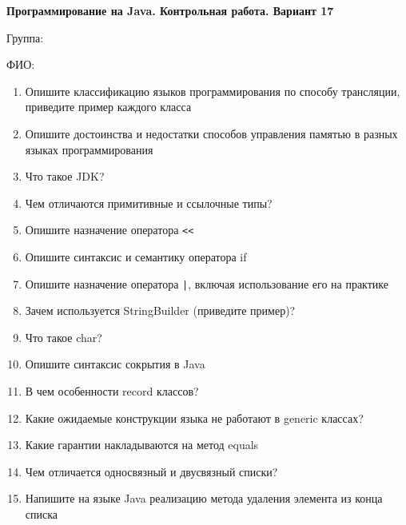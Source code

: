 \documentclass[12pt]{article}
\begin{document}
\newpage\begin{minipage}{\textwidth}
\textbf{Программирование на Java. Контрольная работа. Вариант 17}

Группа: \underline{\hspace{3cm}}

ФИО: \underline{\hspace{10cm}}

\begin{enumerate}
\item Опишите классификацию языков программирования по способу трансляции, приведите пример каждого класса
\item Опишите достоинства и недостатки способов управления памятью в разных языках программирования
\item Что такое JDK?
\item Чем отличаются примитивные и ссылочные типы?
\item Опишите назначение оператора \verb|<<|
\item Опишите синтаксис и семантику оператора if
\item Опишите назначение оператора \verb!|!, включая использование его на практике
\item Зачем используется StringBuilder (приведите пример)?
\item Что такое char?
\item Опишите синтаксис сокрытия в Java
\item В чем особенности record классов?
\item Какие ожидаемые конструкции языка не работают в generic классах?
\item Какие гарантии накладываются на метод equals
\item Чем отличается односвязный и двусвязный списки?
\item Напишите на языке Java реализацию метода удаления элемента из конца списка

\end{enumerate}
\end{minipage}
\end{document}
